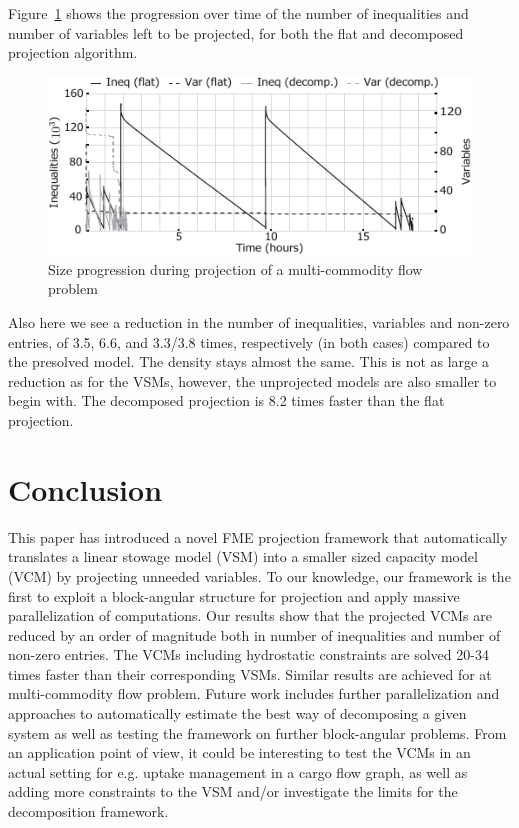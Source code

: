 \documentclass{llncs}
\begin{document}
Figure~\ref{fig:multicom} shows the progression over time of the number of inequalities and number of variables left to be projected, for both the flat and decomposed projection algorithm.
\begin{figure}[tb]
	\centering
		\includegraphics{figures/newMultiComGraph2.pdf}
	\caption{Size progression during projection of a multi-commodity flow problem}
	\label{fig:multicom}
\end{figure}
Also here we see a reduction in the number of inequalities, variables and non-zero entries, of 3.5, 6.6, and 3.3/3.8 times, respectively (in both cases) compared to the presolved model. The density stays almost the same. 
This is not as large a reduction as for the VSMs, however, the unprojected models are also smaller to begin with. The decomposed projection is 8.2 times faster than the flat projection.

\section{Conclusion}\label{sec:conclusion}
This paper has introduced a novel FME projection framework that automatically translates a linear stowage model (VSM) into a smaller sized capacity model (VCM) by projecting unneeded variables. To our knowledge, our framework is the first to exploit a block-angular structure for projection and apply massive parallelization of computations. Our results show that the projected VCMs are reduced by an order of magnitude both in number of inequalities and number of non-zero entries. The VCMs including hydrostatic constraints are solved 20-34 times faster than their corresponding VSMs. Similar results are achieved for at multi-commodity flow problem. 
Future work includes further parallelization and approaches to automatically estimate the best way of decomposing a given system as well as testing the framework on further block-angular problems. 
From an application point of view, it could be interesting to test the VCMs in an actual setting for e.g. uptake management in a cargo flow graph, as well as adding more constraints to the VSM and/or investigate the limits for the decomposition framework. 
\end{document}
